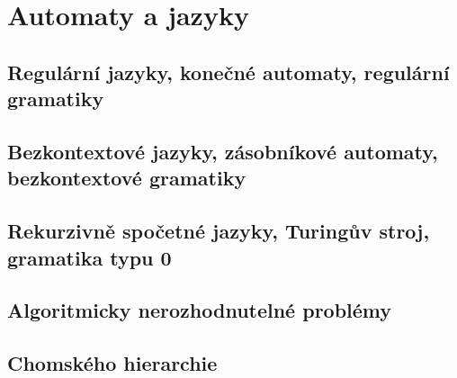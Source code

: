 \documentclass[../../main.tex]{subfiles}
\begin{document}
\section{Automaty a jazyky}

\subsection{Regulární jazyky, konečné automaty, regulární gramatiky}
\subsection{Bezkontextové jazyky, zásobníkové automaty, bezkontextové gramatiky}
\subsection{Rekurzivně spočetné jazyky, Turingův stroj, gramatika typu 0}
\subsection{Algoritmicky nerozhodnutelné problémy}
\subsection{Chomského hierarchie}
\end{document}
